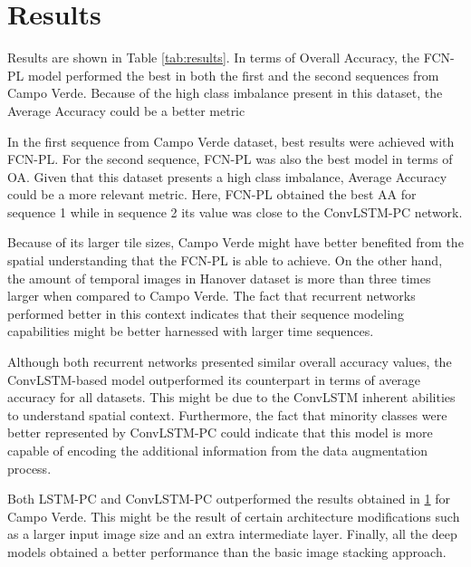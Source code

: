 
\section{Results}


Results are shown in Table \ref{tab:results}. In terms of Overall Accuracy, the FCN-PL model performed the best in both the first and the second sequences from Campo Verde. Because of the high class imbalance present in this dataset, the Average Accuracy could be a better metric

In the first sequence from Campo Verde dataset, best results were achieved with FCN-PL. For the second sequence, FCN-PL was also the best model in terms of OA. Given that this dataset presents a high class imbalance, Average Accuracy could be a more relevant metric. Here, FCN-PL obtained the best AA for sequence 1 while in sequence 2 its value was close to the ConvLSTM-PC network. 

Because of its larger tile sizes, Campo Verde might have better benefited from the spatial understanding that the FCN-PL is able to achieve. On the other hand, the amount of temporal images in Hanover dataset is more than three times larger when compared to Campo Verde. The fact that recurrent networks performed better in this context indicates that their sequence modeling capabilities might be better harnessed with larger time sequences.

Although both recurrent networks presented similar overall accuracy values, the ConvLSTM-based model outperformed its counterpart in terms of average accuracy for all datasets. This might be due to the ConvLSTM inherent abilities to understand spatial context. Furthermore, the fact that minority classes were better represented by ConvLSTM-PC could indicate that this model is more capable of encoding the additional information from the data augmentation process. 

Both LSTM-PC and ConvLSTM-PC outperformed the results obtained in \ref{} for Campo Verde. This might be the result of certain architecture modifications such as a larger input image size and an extra intermediate layer. Finally, all the deep models obtained a better performance than the basic image stacking approach. 

